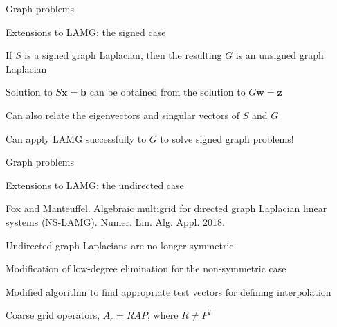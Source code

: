 \documentclass[18pt,xcolor=table]{beamer}
\begin{document}
\begin{frame}{Graph problems}
\begin{block}{Extensions to LAMG: the signed case}
\bit
\item If $S$ is a signed graph Laplacian, then the resulting $G$ is an unsigned graph Laplacian
\item Solution to $S\mathbf{x} = \mathbf{b}$ can be obtained from the solution to $G\mathbf{w} = \mathbf{z}$
\item Can also relate the eigenvectors and singular vectors of $S$ and $G$
\item Can apply LAMG successfully to $G$ to solve signed graph problems!
\eit
\end{block}
\end{frame}

\begin{frame}{Graph problems}
\begin{block}{Extensions to LAMG: the undirected case}
\bit
\item Fox and Manteuffel. Algebraic multigrid for directed graph Laplacian linear systems (NS-LAMG). Numer. Lin. Alg. Appl. 2018.
\item Undirected graph Laplacians are no longer symmetric
\item Modification of low-degree elimination for the non-symmetric case
\item Modified algorithm to find appropriate test vectors for defining interpolation
\item Coarse grid operators, $A_c = RAP$, where $R\neq P^T$
\eit
\end{block}
\end{frame}

\end{document}
